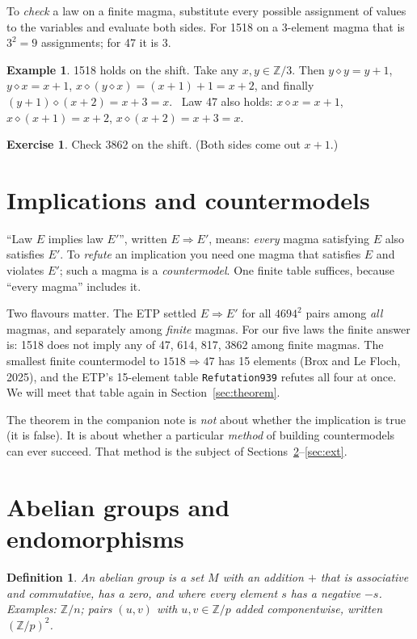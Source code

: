 \documentclass[11pt]{article}
\newtheorem{definition}{Definition}
\theoremstyle{definition}\newtheorem{example}{Example}\newtheorem{exercise}{Exercise}
\theoremstyle{remark}\newtheorem*{remark}{Remark}
\newcommand{\op}{\diamond}
\newcommand{\Z}{\mathbb{Z}}
\begin{document}
To \emph{check} a law on a finite magma, substitute every possible assignment of values to the variables and evaluate both sides. For 1518 on a 3-element magma that is $3^2=9$ assignments; for 47 it is 3.

\begin{example}
1518 holds on the shift. Take any $x,y\in\Z/3$. Then $y\op y = y+1$, $y\op x = x+1$, $x\op(y\op x)=(x+1)+1=x+2$, and finally $(y+1)\op(x+2) = x+3 = x$. \checkmark\ Law 47 also holds: $x\op x = x+1$, $x\op(x+1)=x+2$, $x\op(x+2)=x+3=x$. \checkmark
\end{example}

\begin{exercise}
Check 3862 on the shift. (Both sides come out $x+1$.)
\end{exercise}

\section{Implications and countermodels}\label{sec:impl}

``Law $E$ implies law $E'$'', written $E\Rightarrow E'$, means: \emph{every} magma satisfying $E$ also satisfies $E'$. To \emph{refute} an implication you need one magma that satisfies $E$ and violates $E'$; such a magma is a \emph{countermodel}. One finite table suffices, because ``every magma'' includes it.

Two flavours matter. The ETP settled $E\Rightarrow E'$ for all $4694^2$ pairs among \emph{all} magmas, and separately among \emph{finite} magmas. For our five laws the finite answer is: 1518 does not imply any of 47, 614, 817, 3862 among finite magmas. The smallest finite countermodel to $1518\Rightarrow47$ has 15 elements (Brox and Le Floch, 2025), and the ETP's 15-element table \texttt{Refutation939} refutes all four at once. We will meet that table again in Section~\ref{sec:theorem}.

The theorem in the companion note is \emph{not} about whether the implication is true (it is false). It is about whether a particular \emph{method} of building countermodels can ever succeed. That method is the subject of Sections~\ref{sec:groups}--\ref{sec:ext}.

\section{Abelian groups and endomorphisms}\label{sec:groups}

\begin{definition}
An \emph{abelian group} is a set $M$ with an addition $+$ that is associative and commutative, has a zero, and where every element $s$ has a negative $-s$. Examples: $\Z/n$; pairs $(u,v)$ with $u,v\in\Z/p$ added componentwise, written $(\Z/p)^2$.
\end{definition}
\end{document}
